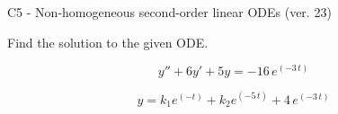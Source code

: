 \begin{exercise}
  \begin{exerciseTitle}C5 - Non-homogeneous second-order linear ODEs (ver. 23)\end{exerciseTitle}
  \begin{exerciseStatement}
    
Find the solution to the given ODE.

    
\[y''+6y'+5y = -16 \, e^{\left(-3 \, t\right)}\]

  \end{exerciseStatement}
  \begin{exerciseAnswer}
    
\[y= k_{1} e^{\left(-t\right)} + k_{2} e^{\left(-5 \, t\right)} + 4 \, e^{\left(-3 \, t\right)}\]

  \end{exerciseAnswer}
\end{exercise}